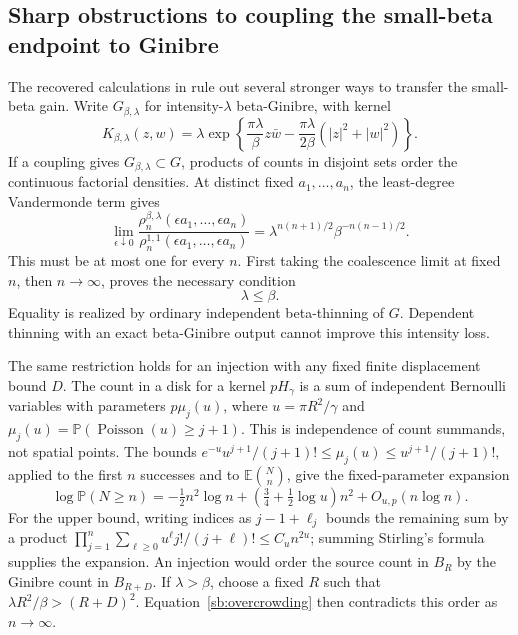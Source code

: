 \documentclass[11pt,a4paper]{article}
\theoremstyle{definition}
\theoremstyle{remark}
\numberwithin{equation}{section}
\begin{document}
\subsection{Sharp obstructions to coupling the small-beta endpoint to Ginibre}
\label{sb:coupling-barriers}

The recovered calculations in
 rule out
several stronger ways to transfer the small-beta gain. Write
$G_{\beta,\lambda}$ for intensity-$\lambda$ beta-Ginibre, with kernel
\[
 K_{\beta,\lambda}(z,w)=\lambda
  \exp\left\{\frac{\pi\lambda}{\beta}z\bar w
     -\frac{\pi\lambda}{2\beta}(|z|^2+|w|^2)\right\}.
\]
If a coupling gives $G_{\beta,\lambda}\subset G$, products of counts
in disjoint sets order the continuous factorial densities. At distinct
fixed $a_1,\ldots,a_n$, the least-degree Vandermonde term gives
\[
 \lim_{\epsilon\downarrow0}
 \frac{\rho_n^{\beta,\lambda}(\epsilon a_1,\ldots,\epsilon a_n)}
      {\rho_n^{1,1}(\epsilon a_1,\ldots,\epsilon a_n)}
 =\lambda^{n(n+1)/2}\beta^{-n(n-1)/2}.
\]
This must be at most one for every $n$. First taking the coalescence
limit at fixed $n$, then $n\to\infty$, proves the necessary condition
\begin{equation}\label{sb:inclusion-barrier}
 \lambda\le\beta.
\end{equation}
Equality is realized by ordinary independent beta-thinning of $G$.
Dependent thinning with an exact beta-Ginibre output cannot improve
this intensity loss.

The same restriction holds for an injection with any fixed finite
displacement bound $D$. The count in a disk for a kernel $pH_\gamma$
is a sum of independent Bernoulli variables with parameters
$p\mu_j(u)$, where
$u=\pi R^2/\gamma$ and
$\mu_j(u)=\mathbb P(\operatorname{Poisson}(u)\ge j+1)$.
This is independence of count summands, not spatial points.
The bounds
$e^{-u}u^{j+1}/(j+1)!\le\mu_j(u)\le u^{j+1}/(j+1)!$,
applied to the first $n$ successes and to $\mathbb E\binom Nn$,
give the fixed-parameter expansion
\begin{equation}\label{sb:overcrowding}
 \log\mathbb P(N\ge n)
 =-\tfrac12n^2\log n+
          (\tfrac34+\tfrac12\log u)n^2+O_{u,p}(n\log n).
\end{equation}
For the upper bound, writing indices as $j-1+\ell_j$ bounds the
remaining sum by a product
$\prod_{j=1}^n\sum_{\ell\ge0}u^\ell j!/(j+\ell)!
\le C_u n^{2u}$; summing Stirling's formula supplies the expansion.
An injection would order the source count in $B_R$ by the Ginibre
count in $B_{R+D}$. If $\lambda>\beta$, choose a fixed $R$ such that
$\lambda R^2/\beta>(R+D)^2$. Equation~\eqref{sb:overcrowding} then
contradicts this order as $n\to\infty$.
\end{document}
